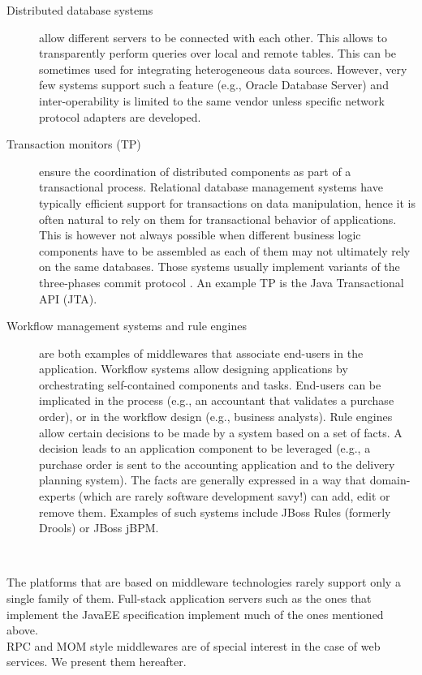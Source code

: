 \begin{description}
  \item[Distributed database systems] allow different servers to be connected with each other. This allows to transparently perform queries over local and remote tables. This can be sometimes used for integrating heterogeneous data sources. However, very few systems support such a feature (e.g., Oracle Database Server) and inter-operability is limited to the same vendor unless specific network protocol adapters are developed.
  
  \item[Transaction monitors (TP)] ensure the coordination of distributed components as part of a transactional process. Relational database management systems have typically efficient support for transactions on data manipulation, hence it is often natural to rely on them for transactional behavior of applications. This is however not always possible when different business logic components have to be assembled as each of them may not ultimately rely on the same databases. Those systems usually implement variants of the three-phases commit protocol \cite{SkeenS83}. An example TP is the Java Transactional API (JTA).
  
  \item[Workflow management systems and rule engines] are both examples of middlewares that associate end-users in the application. Workflow systems allow designing applications by orchestrating self-contained components and tasks. End-users can be implicated in the process (e.g., an accountant that validates a purchase order), or in the workflow design (e.g., business analysts). Rule engines allow certain decisions to be made by a system based on a set of facts. A decision leads to an application component to be leveraged (e.g., a purchase order is sent to the accounting application and to the delivery planning system). The facts are generally expressed in a way that domain-experts (which are rarely software development savy!) can add, edit or remove them. Examples of such systems include JBoss Rules (formerly Drools) or JBoss jBPM.
  
\end{description}\

The platforms that are based on middleware technologies rarely support only a single family of them. Full-stack application servers such as the ones that implement the JavaEE specification implement much of the ones mentioned above.\\

RPC and MOM style middlewares are of special interest in the case of web services. We present them hereafter.\\

